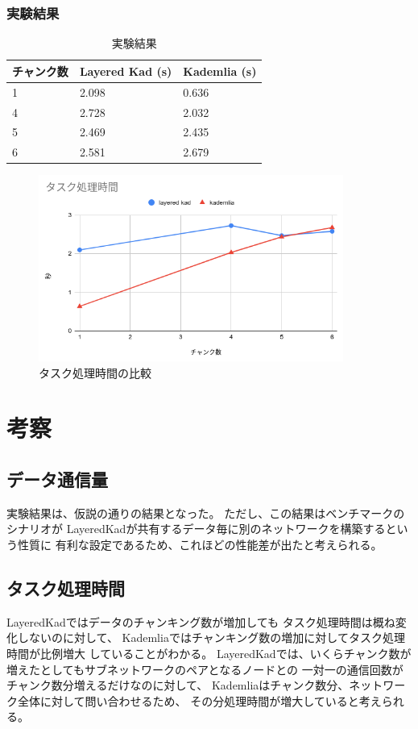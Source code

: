 \documentclass[sotsuron]{jcsie}
\begin{document}
\subsubsection{実験結果}
\begin{table}[H]
	\caption{実験結果}	
	\centering
	\label{table:calc-result}
	\begin{tabular}{|l|l|l|}
		\hline
		チャンク数 &   
		Layered Kad (s) &   
		Kademlia (s)\\ 
		\hline
		1               &   
		2.098           &   
		0.636\\
		\hline
		4               &   
		2.728           &   
		2.032\\
		\hline
		5               &   
		2.469           &   
		2.435\\
		\hline
		6               &   
		2.581           &   
		2.679\\
		\hline
	\end{tabular}	
\end{table}

\begin{figure}[H]
	\centering
	\includegraphics[width=10cm]{./assets/image/calc_compare.png}
	\caption{タスク処理時間の比較}
	\label{fig:calc_compare.png}
\end{figure}

\section{考察}
\subsection{データ通信量}
実験結果は、仮説の通りの結果となった。
ただし、この結果はベンチマークのシナリオが
LayeredKadが共有するデータ毎に別のネットワークを構築するという性質に
有利な設定であるため、これほどの性能差が出たと考えられる。

\subsection{タスク処理時間}
LayeredKadではデータのチャンキング数が増加しても
タスク処理時間は概ね変化しないのに対して、
Kademliaではチャンキング数の増加に対してタスク処理時間が比例増大
していることがわかる。
LayeredKadでは、いくらチャンク数が増えたとしてもサブネットワークのペアとなるノードとの
一対一の通信回数がチャンク数分増えるだけなのに対して、
Kademliaはチャンク数分、ネットワーク全体に対して問い合わせるため、
その分処理時間が増大していると考えられる。
\end{document}
